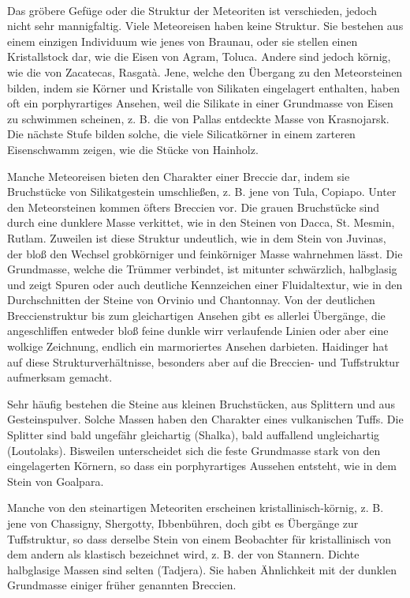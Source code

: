 \documentclass[a4paper, 12pt, oneside]{article}
\begin{document}
\paragraph*{}
Das gröbere Gefüge oder die Struktur der Meteoriten ist verschieden, jedoch nicht sehr mannigfaltig. Viele Meteoreisen haben keine Struktur. Sie bestehen aus einem einzigen Individuum wie jenes von Braunau, oder sie stellen einen Kristallstock dar, wie die Eisen von Agram, Toluca. Andere sind jedoch körnig, wie die von Zacatecas, Rasgatà. Jene, welche den Übergang zu den Meteorsteinen bilden, indem sie Körner und Kristalle von Silikaten eingelagert enthalten, haben oft ein porphyrartiges Ansehen, weil die Silikate in einer Grundmasse von Eisen zu schwimmen scheinen, z. B. die von Pallas entdeckte Masse von Krasnojarsk. Die nächste Stufe bilden solche, die viele Silicatkörner in einem zarteren Eisenschwamm zeigen, wie die Stücke von Hainholz.

Manche Meteoreisen bieten den Charakter einer Breccie dar, indem sie Bruchstücke von Silikatgestein umschließen, z. B. jene von Tula, Copiapo. Unter den Meteorsteinen kommen öfters Breccien vor. Die grauen Bruchstücke sind durch eine dunklere Masse verkittet, wie in den Steinen von Dacca, St. Mesmin, Rutlam. Zuweilen ist diese Struktur undeutlich, wie in dem Stein von Juvinas, der bloß den Wechsel grobkörniger und feinkörniger Masse wahrnehmen lässt. Die Grundmasse, welche die Trümmer verbindet, ist mitunter schwärzlich, halbglasig und zeigt Spuren oder auch deutliche Kennzeichen einer Fluidaltextur, wie in den Durchschnitten der Steine von Orvinio und Chantonnay. Von der deutlichen Breccienstruktur bis zum gleichartigen Ansehen gibt es allerlei Übergänge, die angeschliffen entweder bloß feine dunkle wirr verlaufende Linien oder aber eine wolkige Zeichnung, endlich ein marmoriertes Ansehen darbieten. Haidinger hat auf diese Strukturverhältnisse, besonders aber auf die Breccien- und Tuffstruktur aufmerksam gemacht.

Sehr häufig bestehen die Steine aus kleinen Bruchstücken, aus Splittern und aus Gesteinspulver. Solche Massen haben den Charakter eines vulkanischen Tuffs. Die Splitter sind bald ungefähr gleichartig (Shalka), bald auffallend ungleichartig (Loutolaks). Bisweilen unterscheidet sich die feste Grundmasse stark von den eingelagerten Körnern, so dass ein porphyrartiges Aussehen entsteht, wie in dem Stein von Goalpara.

Manche von den steinartigen Meteoriten erscheinen kristallinisch-körnig, z. B. jene von Chassigny, Shergotty, Ibbenbühren, doch gibt es Übergänge zur Tuffstruktur, so dass derselbe Stein von einem Beobachter für kristallinisch von dem andern als klastisch bezeichnet wird, z. B. der von Stannern. Dichte halbglasige Massen sind selten (Tadjera). Sie haben Ähnlichkeit mit der dunklen Grundmasse einiger früher genannten Breccien.
\end{document}
